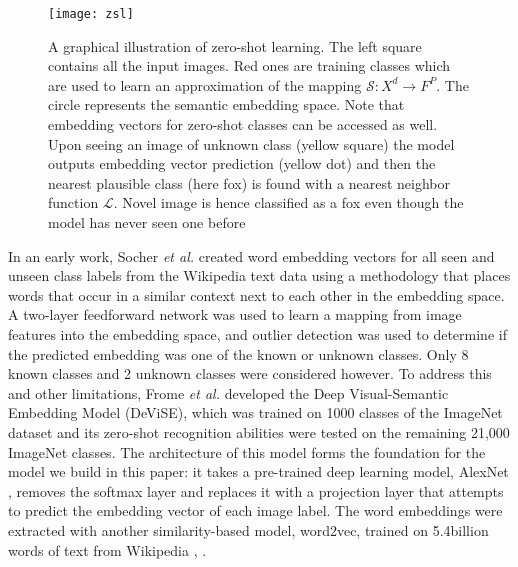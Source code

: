 \documentclass[12pt]{report}
\begin{document}
\begin{figure}
  \centering
	\texttt{[image: zsl]}
	\caption{A graphical illustration of zero-shot learning. The left square contains all the input images. Red ones are training classes which are used to learn an approximation of the mapping $\mathcal{S}:X^d \rightarrow F^P$. The circle represents the semantic embedding space. Note that embedding vectors for zero-shot classes can be accessed as well. Upon seeing an image of unknown class (yellow square) the model outputs embedding vector prediction (yellow dot) and then the nearest plausible class (here fox) is found with a nearest neighbor function $\mathcal{L}$. Novel image is hence classified as a fox even though the model has never seen one before}
	\label{fig:zsl}
\end{figure}

In an early work, Socher \textit{et al.} \cite{Socher} created word embedding vectors for all seen and unseen class labels from the Wikipedia text data using a methodology \cite{Huang2012} that places words that occur in a similar context next to each other in the embedding space. A two-layer feedforward network was used to learn a mapping from image features into the embedding space, and outlier detection was used to determine if the predicted embedding was one of the known or unknown classes. Only 8 known classes and 2 unknown classes were considered however. To address this and other limitations, Frome \textit{et al.} \cite{Frome2013} developed the Deep Visual-Semantic Embedding Model (DeViSE), which was trained on 1000 classes of the ImageNet dataset \cite{JiaDeng2009} and its zero-shot recognition abilities were tested on the remaining 21,000 ImageNet classes. The architecture of this model forms the foundation for the model we build in this paper: it takes a pre-trained deep learning model, AlexNet \cite{Krizhevsky2012}, removes the softmax layer and replaces it with a projection layer that attempts to predict the embedding vector of each image label. The word embeddings were extracted with another similarity-based model, word2vec, trained on 5.4billion words of text from Wikipedia \cite{Mikolov2013}, \cite{Mikolov}. 
\end{document}
